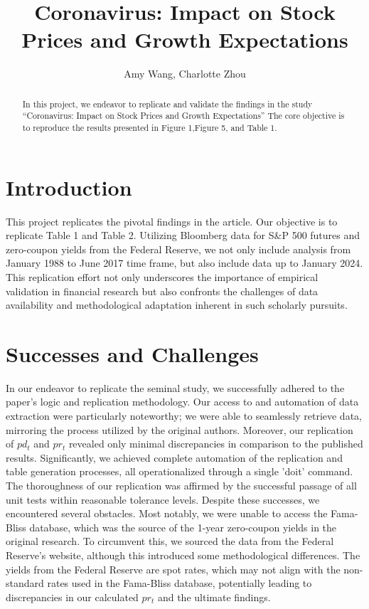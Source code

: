 \documentclass{article}
\title{Coronavirus: Impact on Stock Prices and Growth Expectations}
\author{Amy Wang, Charlotte Zhou}
\begin{document}
\maketitle
\begin{abstract}
  In this project, we endeavor to replicate and validate the 
findings in the study ``Coronavirus: Impact on Stock Prices and Growth Expectations''
 The core objective is to reproduce the results 
presented in Figure 1,Figure 5, and Table 1.
  \end{abstract}


\section{Introduction}
This project replicates the pivotal findings in the article. Our 
objective is to replicate Table 1 and Table 2. Utilizing Bloomberg 
data for S\&P 500 futures and zero-coupon yields from the Federal 
Reserve, we not only include analysis from January 1988 to June 
2017 time frame, but also include data up to January 2024. This 
replication effort not only underscores the importance of empirical 
validation in financial research but also confronts the challenges 
of data availability and methodological adaptation inherent in such 
scholarly pursuits.

\raggedright
\section{Successes and Challenges}
In our endeavor to replicate the seminal study, we successfully adhered to the paper's logic and replication methodology. Our access
to and automation of data extraction were particularly noteworthy; we were able to seamlessly retrieve data, mirroring the process utilized
by the original authors. Moreover, our replication of $pd_t$ and $pr_t$
revealed only minimal discrepancies in comparison to the published results.
Significantly, we achieved complete automation of the replication and
table generation processes, all operationalized through a single 'doit'
command. The thoroughness of our replication was affirmed by the
successful passage of all unit tests within reasonable tolerance levels.\newline
\newline
Despite these successes, we encountered several obstacles. Most notably, 
we were unable to access the Fama-Bliss database, which was the 
source of the 1-year zero-coupon yields in the original research. To 
circumvent this, we sourced the data from the Federal Reserve's website, 
although this introduced some methodological differences. The yields 
from the Federal Reserve are spot rates, which may not align with the 
non-standard rates used in the Fama-Bliss database, potentially leading 
to discrepancies in our calculated $pr_t$ and the ultimate findings. 
\end{document}
